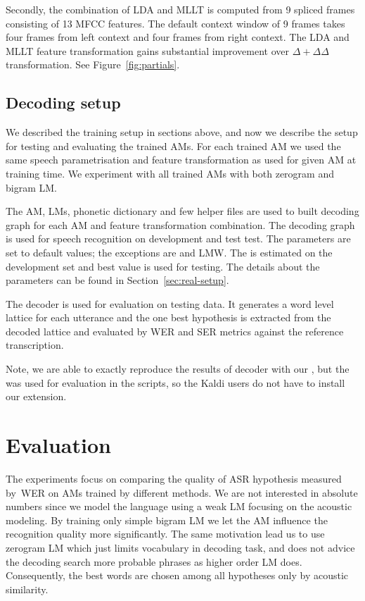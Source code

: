 Secondly, the combination of \ac{LDA} and \ac{MLLT} is computed from 9 spliced frames consisting of 13 \ac{MFCC} features. 
The default context window of 9 frames takes four frames from left context and four frames from right context.
The \ac{LDA} and \ac{MLLT} feature transformation gains substantial improvement over $\Delta+\Delta\Delta$ transformation.
See Figure~\ref{fig:partials}.

\subsection*{Decoding setup}
We described the training setup in sections above, and now we describe the setup for testing and evaluating the trained \acp{AM}.
For each trained \ac{AM} we used the same speech parametrisation and feature transformation as used for given \ac{AM} at training time.
We experiment with all trained \acp{AM} with both zerogram and bigram \ac{LM}.

The \ac{AM}, \acp{LM}, phonetic dictionary and few helper files are used to built  decoding graph for each \ac{AM} and feature transformation combination.
The decoding graph is used for speech recognition on development and test test.
The parameters are set to default values; the exceptions are  and  \acl{LMW}. 
The  is estimated on the development set and best value is used for testing.
The details about the parameters can be found in Section~\ref{sec:real-setup}.

The  decoder is used for evaluation on testing data.
It generates a word level lattice for each utterance and the one best hypothesis is extracted from the decoded lattice and evaluated by \ac{WER} and \ac{SER} metrics against the reference transcription.

Note, we are able to exactly reproduce the results of  decoder with our , but the  was used for evaluation in the scripts, so the Kaldi users do not have to install our extension.

\section{Evaluation}
\label{sec:am_eval}

The experiments focus on comparing the quality of ASR hypothesis measured by~\ac{WER} on \acp{AM} trained by different methods.
We are not interested in absolute numbers since we model the language using a weak \ac{LM} focusing on the acoustic modeling.
By training only simple bigram \ac{LM} we let the \ac{AM} influence the recognition quality more significantly. 
The same motivation lead us to use zerogram \ac{LM} which just limits vocabulary in decoding task, and does not advice the decoding search more probable phrases as higher order \ac{LM} does.
Consequently, the best words are chosen among all hypotheses only by acoustic similarity.

